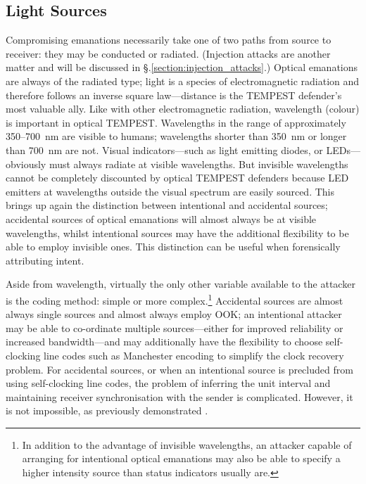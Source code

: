 \documentclass[a4paper,twoside,11pt]{book}
\begin{document}
\subsection{Light Sources}
Compromising emanations necessarily take one of two paths from source to
receiver: they may be conducted or
radiated. (Injection attacks are another matter and will be discussed in
\S \thechapter.\ref{section:injection_attacks}.) Optical emanations are always
of the radiated type; light is a species of electromagnetic radiation and
therefore follows an inverse square law---distance is the TEMPEST defender's
most valuable ally. Like with other electromagnetic radiation, wavelength
(colour) is important in optical TEMPEST. Wavelengths in the range of
approximately 350--\SI{700}{\nano\metre} are visible to
humans; wavelengths shorter than \SI{350}{\nano\metre} or longer than
\SI{700}{\nano\metre} are not. Visual indicators---such as light emitting
diodes, or LEDs---obviously must always radiate at visible wavelengths. But
invisible wavelengths cannot be completely discounted by optical TEMPEST
defenders because LED emitters at wavelengths outside the visual spectrum are
easily sourced. This brings up again the distinction between intentional and
accidental sources; accidental sources of optical emanations will almost always
be at visible wavelengths, whilst intentional sources may have the additional
flexibility to be able to employ invisible ones. This distinction can be useful
when forensically attributing intent.

Aside from wavelength, virtually the only other variable available to the
attacker is the coding method: simple or more complex.\footnote{In addition to
the advantage of invisible wavelengths, an attacker capable of arranging for
intentional optical emanations may also be able to specify a higher intensity
source than status indicators usually are.} Accidental sources are almost
always single sources and almost always employ OOK; an intentional attacker may
be able to co-ordinate multiple sources---either for improved reliability or
increased bandwidth---and may additionally have the flexibility to choose
self-clocking line codes such as Manchester encoding to simplify the clock
recovery problem. For accidental sources, or when an intentional source is
precluded from using self-clocking line codes, the problem of inferring the
unit interval and maintaining receiver synchronisation with the sender is
complicated. However, it is not impossible, as previously demonstrated
\cite[\S 8.2]{Loughry2002a}.
\end{document}

